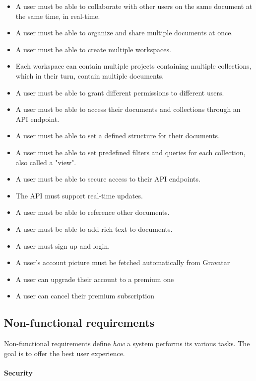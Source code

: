 \begin{itemize}
	\item A user must be able to collaborate with other users on the same document at the same time, in real-time.
	\item A user must be able to organize and share multiple documents at once.
	\item A user must be able to create multiple workspaces.
	\item Each workspace can contain multiple projects containing multiple collections, which in their turn, contain multiple documents.
	\item A user must be able to grant different permissions to different users.
	\item A user must be able to access their documents and collections through an API endpoint.
	\item A user must be able to set a defined structure for their documents.
	\item A user must be able to set predefined filters and queries for each collection, also called a "view".
	\item A user must be able to secure access to their API endpoints.
	\item The API must support real-time updates.
	\item A user must be able to reference other documents.
	\item A user must be able to add rich text to documents.
	\item
	      A user must sign up and login.
	\item
	      A user's account picture must be fetched automatically from Gravatar
	\item
	      A user can upgrade their account to a premium one
	\item
	      A user can cancel their premium subscription
\end{itemize}

\subsection{Non-functional requirements}

Non-functional requirements define \textit{how} a system performs its various tasks.
The goal is to offer the best user experience.

\paragraph{Security}

